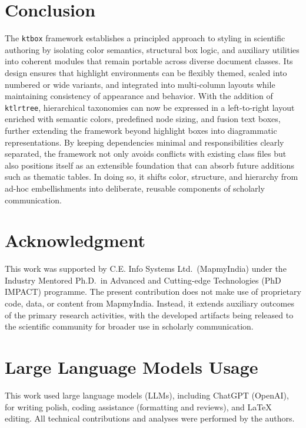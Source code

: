 \documentclass[12pt,onecolumn]{article}
\begin{document}
  \section{Conclusion}
  \label{sec:conclusion}
The \texttt{ktbox} framework establishes a principled approach to styling in scientific authoring by isolating color semantics, structural box logic, and auxiliary utilities into coherent modules that remain portable across diverse document classes. Its design ensures that highlight environments can be flexibly themed, scaled into numbered or wide variants, and integrated into multi-column layouts while maintaining consistency of appearance and behavior. With the addition of \texttt{ktlrtree}, hierarchical taxonomies can now be expressed in a left-to-right layout enriched with semantic colors, predefined node sizing, and fusion text boxes, further extending the framework beyond highlight boxes into diagrammatic representations. By keeping dependencies minimal and responsibilities clearly separated, the framework not only avoids conflicts with existing class files but also positions itself as an extensible foundation that can absorb future additions such as thematic tables. In doing so, it shifts color, structure, and hierarchy from ad-hoc embellishments into deliberate, reusable components of scholarly communication.


  \section*{Acknowledgment}
This work was supported by C.E. Info Systems Ltd.\ (MapmyIndia) under the Industry Mentored Ph.D.\ in Advanced and Cutting-edge Technologies (PhD IMPACT) programme. The present contribution does not make use of proprietary code, data, or content from MapmyIndia. Instead, it extends auxiliary outcomes of the primary research activities, with the developed artifacts being released to the scientific community for broader use in scholarly communication.


\section*{Large Language Models Usage}
This work used large language models (LLMs), including ChatGPT (OpenAI), for writing polish, coding assistance (formatting and reviews), and \LaTeX{} editing. All technical contributions and analyses were performed by the authors.


  
\end{document}
